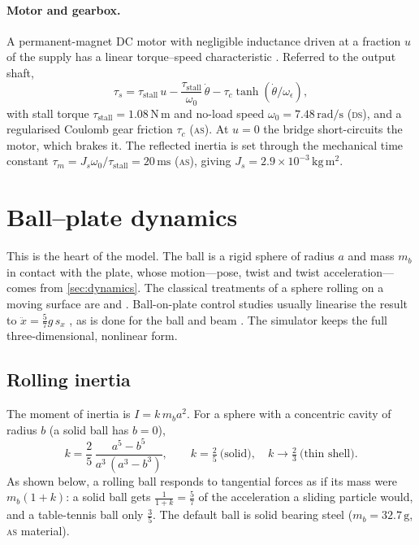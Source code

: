 \documentclass[10pt,a4paper]{article}
\newcommand{\un}[1]{\,\mathrm{#1}}
\newcommand{\tagDS}{\textsc{ds}}
\newcommand{\tagAS}{\textsc{as}}
\begin{document}
\paragraph{Motor and gearbox.} A permanent-magnet DC motor with negligible inductance driven at
a fraction $u$ of the supply has a linear torque--speed characteristic
\citep{franklin2015feedback}. Referred to the output shaft,
\begin{equation}
  \tau_s=\tau_{\mathrm{stall}}\,u-\frac{\tau_{\mathrm{stall}}}{\omega_0}\,\dot\theta-\tau_c\tanh(\dot\theta/\omega_\epsilon),
\end{equation}
with stall torque $\tau_{\mathrm{stall}}=1.08\un{N\,m}$ and no-load speed
$\omega_0=7.48\un{rad/s}$ (\tagDS), and a regularised Coulomb gear friction $\tau_c$ (\tagAS). At
$u=0$ the bridge short-circuits the motor, which brakes it. The reflected inertia is set through
the mechanical time constant $\tau_m=J_s\omega_0/\tau_{\mathrm{stall}}=20\un{ms}$ (\tagAS),
giving $J_s=2.9\times10^{-3}\un{kg\,m^2}$.

\section{Ball--plate dynamics}\label{sec:ball}
This is the heart of the model. The ball is a rigid sphere of radius $a$ and mass $m_b$ in
contact with the plate, whose motion---pose, twist and twist acceleration---comes from
\cref{sec:dynamics}. The classical treatments of a sphere rolling on a moving surface are
\citet{neimark1972dynamics} and \citet{goldstein2002classical}. Ball-on-plate control studies
usually linearise the result to $\ddot x=\frac{5}{7}g\,s_x$ \citep{awtar2002mechatronic}, as is
done for the ball and beam \citep{hauser1992nonlinear}. The simulator keeps the full
three-dimensional, nonlinear form.

\subsection{Rolling inertia}
The moment of inertia is $I=k\,m_ba^2$. For a sphere with a concentric cavity of radius $b$
(a solid ball has $b=0$),
\begin{equation}
  k=\frac{2}{5}\,\frac{a^5-b^5}{a^3\,(a^3-b^3)},
  \qquad k=\tfrac25\ \text{(solid)},\quad k\to\tfrac23\ \text{(thin shell)}.
\end{equation}
As shown below, a rolling ball responds to tangential forces as if its mass were $m_b(1+k)$: a
solid ball gets $\frac{1}{1+k}=\frac57$ of the acceleration a sliding particle would, and a
table-tennis ball only $\frac35$. The default ball is solid bearing steel
($m_b=32.7\un{g}$, \tagAS{} material).
\end{document}
